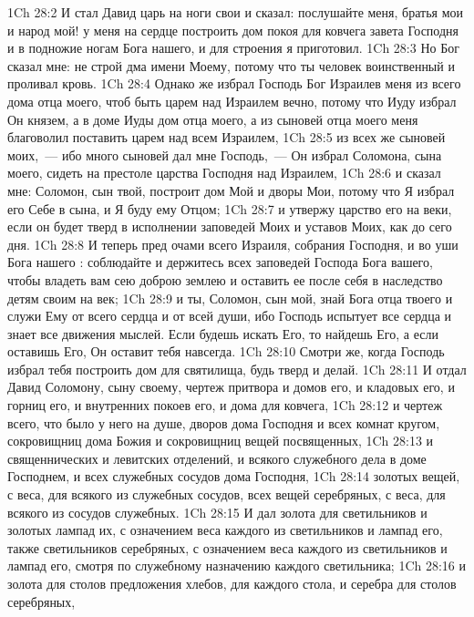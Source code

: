 \vs 1Ch 28:2 И стал Давид царь на ноги свои и сказал: послушайте меня, братья мои и народ мой!  у меня на сердце построить дом покоя для ковчега завета Господня и в подножие ногам Бога нашего, и  для строения я приготовил.
\vs 1Ch 28:3 Но Бог сказал мне: не строй дма имени Моему, потому что ты человек воинственный и проливал кровь.
\vs 1Ch 28:4 Однако же избрал Господь Бог Израилев меня из всего дома отца моего, чтоб быть  царем над Израилем вечно, потому что Иуду избрал Он князем, а в доме Иуды дом отца моего, а из сыновей отца моего меня благоволил поставить царем над всем Израилем,
\vs 1Ch 28:5 из всех же сыновей моих,~--- ибо много сыновей дал мне Господь,~--- Он избрал Соломона, сына моего, сидеть на престоле царства Господня над Израилем,
\vs 1Ch 28:6 и сказал мне: Соломон, сын твой, построит дом Мой и дворы Мои, потому что Я избрал его Себе в сына, и Я буду ему Отцом;
\vs 1Ch 28:7 и утвержу царство его на веки, если он будет тверд в исполнении заповедей Моих и уставов Моих, как до сего дня.
\vs 1Ch 28:8 И теперь пред очами всего Израиля, собрания Господня, и во уши Бога нашего : соблюдайте и держитесь всех заповедей Господа Бога вашего, чтобы владеть вам сею доброю землею и оставить ее после себя в наследство детям своим на век;
\vs 1Ch 28:9 и ты, Соломон, сын мой, знай Бога отца твоего и служи Ему от всего сердца и от всей души, ибо Господь испытует все сердца и знает все движения мыслей. Если будешь искать Его, то найдешь Его, а если оставишь Его, Он оставит тебя навсегда.
\vs 1Ch 28:10 Смотри же, когда Господь избрал тебя построить дом для святилища, будь тверд и делай.
\rsbpar\vs 1Ch 28:11 И отдал Давид Соломону, сыну своему, чертеж притвора и домов его, и кладовых его, и горниц его, и внутренних покоев его, и дома для ковчега,
\vs 1Ch 28:12 и чертеж всего, что было у него на душе, дворов дома Господня и всех комнат кругом, сокровищниц дома Божия и сокровищниц вещей посвященных,
\vs 1Ch 28:13 и священнических и левитских отделений, и всякого служебного дела в доме Господнем, и всех служебных сосудов дома Господня,
\vs 1Ch 28:14 золотых вещей, с  веса, для всякого из служебных сосудов, всех вещей серебряных, с  веса, для всякого из сосудов служебных.
\vs 1Ch 28:15 И дал золота для светильников и золотых лампад их, с означением веса каждого из светильников и лампад его, также светильников серебряных, с означением веса каждого из светильников и лампад его, смотря по служебному назначению каждого светильника;
\vs 1Ch 28:16 и золота для столов предложения хлебов, для каждого  стола, и серебра для столов серебряных,
